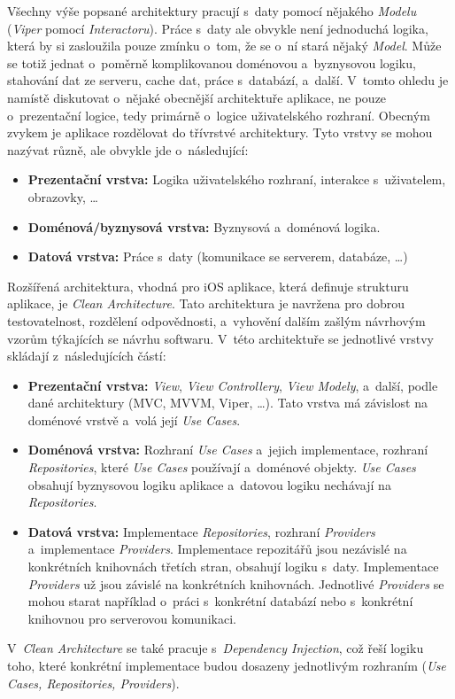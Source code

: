 Všechny výše popsané architektury pracují s~daty pomocí nějakého \emph{Modelu} (\emph{Viper} pomocí \emph{Interactoru}). Práce s~daty ale obvykle není jednoduchá logika, která by si zasloužila pouze zmínku o~tom, že se o~ní stará nějaký \emph{Model}. Může se totiž jednat o~poměrně komplikovanou doménovou a~byznysovou logiku, stahování dat ze serveru, cache dat, práce s~databází, a~další. V~tomto ohledu je namístě diskutovat o~nějaké obecnější architektuře aplikace, ne pouze o~prezentační logice, tedy primárně o~logice uživatelského rozhraní. Obecným zvykem je aplikace rozdělovat do třívrstvé architektury. Tyto vrstvy se mohou nazývat různě, ale obvykle jde o~následující:
\begin{itemize}
\item\textbf{Prezentační vrstva:} Logika uživatelského rozhraní, interakce s~uživatelem, obrazovky, \dots
\item\textbf{Doménová/byznysová vrstva:} Byznysová a~doménová logika.
\item\textbf{Datová vrstva:} Práce s~daty (komunikace se serverem, databáze, \dots)
\end{itemize}
Rozšířená architektura, vhodná pro iOS aplikace, která definuje strukturu aplikace, je \emph{Clean Architecture}. Tato architektura je navržena pro dobrou testovatelnost, rozdělení odpovědnosti, a~vyhovění dalším zašlým návrhovým vzorům týkajících se návrhu softwaru. V~této architektuře se jednotlivé vrstvy skládají z~následujících částí:
\begin{itemize}
\item\textbf{Prezentační vrstva:} \emph{View}, \emph{View Controllery}, \emph{View Modely}, a~další, podle dané architektury (MVC, MVVM, Viper, \dots). Tato vrstva má závislost na doménové vrstvě a~volá její \emph{Use Cases}.
\item\textbf{Doménová vrstva:} Rozhraní \emph{Use Cases} a~jejich implementace, rozhraní \emph{Repositories}, které \emph{Use Cases} používají a~doménové objekty. \emph{Use Cases} obsahují byznysovou logiku aplikace a~datovou logiku nechávají na \emph{Repositories}.
\item\textbf{Datová vrstva:} Implementace \emph{Repositories}, rozhraní \emph{Providers} a~implementace \emph{Providers}. Implementace repozitářů jsou nezávislé na konkrétních knihovnách třetích stran, obsahují logiku s~daty. Implementace \emph{Providers} už jsou závislé na konkrétních knihovnách. Jednotlivé \emph{Providers} se mohou starat například o~práci s~konkrétní databází nebo s~konkrétní knihovnou pro serverovou komunikaci.
\end{itemize}
V~\emph{Clean Architecture} se také pracuje s~\emph{Dependency Injection}, což řeší logiku toho, které konkrétní implementace budou dosazeny jednotlivým rozhraním (\emph{Use Cases, Repositories, Providers}). \cite{ios-clean-arch-mvvm}

